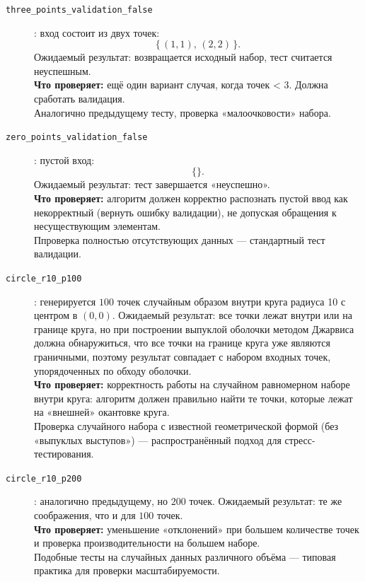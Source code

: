 \documentclass[12pt,a4paper]{article}
\begin{document}
\begin{description}
  \item[\texttt{three\_points\_validation\_false}]: вход состоит из двух точек:
    \[
      \{\, (1,1),\,(2,2) \,\}.
    \]
    Ожидаемый результат: возвращается исходный набор, тест считается неуспешным.  
    \\
    \textbf{Что проверяет:} 
    ещё один вариант случая, когда точек < 3. Должна сработать валидация.  
    \\
    Аналогично предыдущему тесту, проверка «малоочковости» набора.

  \item[\texttt{zero\_points\_validation\_false}]: пустой вход:
    \[
      \{\}.
    \]
    Ожидаемый результат: тест завершается «неуспешно».  
    \\
    \textbf{Что проверяет:} 
    алгоритм должен корректно распознать пустой ввод как некорректный (вернуть ошибку валидации), не допуская обращения к несуществующим элементам.  
    \\
    Ппроверка полностью отсутствующих данных — стандартный тест валидации.

  \item[\texttt{circle\_r10\_p100}]: генерируется \(100\) точек случайным образом внутри круга радиуса 10 с центром в \((0,0)\).  
    Ожидаемый результат: все точки лежат внутри или на границе круга, но при построении выпуклой оболочки методом Джарвиса должна обнаружиться, что все точки на границе круга уже являются граничными, поэтому результат совпадает с набором входных точек, упорядоченных по обходу оболочки.  
    \\
    \textbf{Что проверяет:} 
    корректность работы на случайном равномерном наборе внутри круга: алгоритм должен правильно найти те точки, которые лежат на «внешней» окантовке круга.  
    \\
    Проверка случайного набора с известной геометрической формой (без «выпуклых выступов») — распространённый подход для стресс-тестирования.

  \item[\texttt{circle\_r10\_p200}]: аналогично предыдущему, но \(200\) точек.  
    Ожидаемый результат: те же соображения, что и для \(100\) точек.  
    \\
    \textbf{Что проверяет:} 
    уменьшение «отклонений» при большем количестве точек и проверка производительности на большем наборе.  
    \\
    Подобные тесты на случайных данных различного объёма — типовая практика для проверки масштабируемости.


\end{description}
\end{document}
